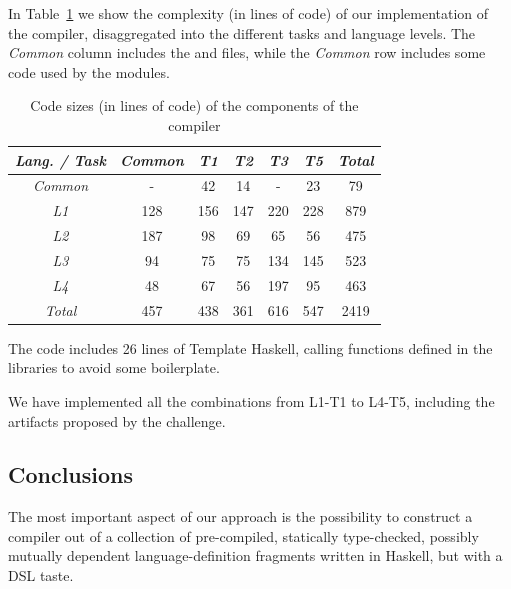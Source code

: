 In Table~\ref{table:locs} we show the complexity (in lines of code) of our implementation of the compiler,
disaggregated into the different tasks and language levels.
The \emph{Common} column includes the  and  files,
while the \emph{Common} row includes some code used by the  modules.
\begin{table}\centering
\begin{tabular}{ | c || c | c | c | c | c | c | }
  \hline                        
  \emph{Lang. / Task} & \emph{Common} & \emph{T1} & \emph{T2} & \emph{T3} & \emph{T5} & \emph{Total} \\
  \hline                        
  \hline                        
  \emph{Common} & - & 42 & 14 & - & 23 & 79  \\
  \hline                        
  \emph{L1} & 128 & 156 & 147 & 220 & 228 & 879  \\
  \hline  
  \emph{L2} & 187 & 98 & 69 & 65 & 56 & 475  \\
  \hline  
  \emph{L3} & 94 & 75 & 75 & 134 & 145 & 523  \\
  \hline 
  \emph{L4} & 48 & 67 & 56 & 197 & 95 & 463  \\
  \hline 
  \emph{Total} & 457 & 438 & 361 & 616 & 547 & 2419  \\
  \hline 
\end{tabular}
\caption{Code sizes (in lines of code) of the components of the compiler}
\label{table:locs}
\end{table}

The code includes 26 lines of Template Haskell, calling functions defined in the libraries to avoid some boilerplate.

We have implemented all the combinations from L1-T1 to L4-T5, including the artifacts proposed by the challenge.



\subsection{Conclusions}

The most important aspect of our approach is the possibility to construct a compiler 
out of a collection of pre-compiled, statically type-checked, possibly mutually dependent
language-definition fragments written in Haskell, but with a DSL taste.

